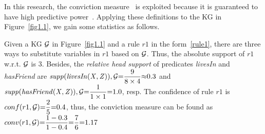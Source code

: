 In this research, the conviction measure~\cite{ref48} is exploited because it is guaranteed to have high predictive power~\cite{ref46}. Applying these definitions to the KG in Figure~\ref{fig1.1}, we gain some statistics as follows.

\begin{example}
Given a KG $\mathcal{G}$ in Figure~\ref{fig1.1} and a rule $r1$ in the form~\ref{rule1}, there are three ways to substitute variables in $r1$ based on $\mathcal{G}$. Thus, the absolute support of $r1$ w.r.t. $\mathcal{G}$ is $3$. Besides, the \textit{relative head support} of predicates \textit{livesIn} and \textit{hasFriend} are $\mathit{supp(livesIn(X,Z)), \mathcal{G}}{=}\dfrac{9}{8 \times 4}{\approx} 0.3$ and  $\mathit{supp(hasFriend(X,Z)), \mathcal{G}}{=}\dfrac{1}{1 \times 1}{=} 1.0$, resp. The confidence of rule $r1$ is $conf(r1, \mathcal{G}) {=} \dfrac{2}{5} {=} 0.4$, thus, the conviction measure can be found as $conv(r1, \mathcal{G}) {=} \dfrac{1-0.3}{1 - 0.4} {=} \dfrac{7}{6} {=} 1.17$
\end{example}